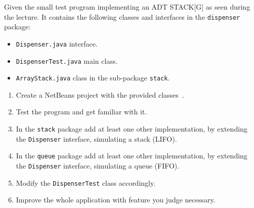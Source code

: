 
Given the small test program implementing an ADT STACK[G] as seen during the lecture. It contains the following classes and interfaces in the \texttt{dispenser} package:
\begin{itemize}
 \item \texttt{Dispenser.java} interface.
 \item \texttt{DispenserTest.java} main class.
 \item \texttt{ArrayStack.java} class in the sub-package \texttt{stack}.
\end{itemize}

\begin{enumerate}
 \item Create a NetBeans project with the provided classes~\cite{WEBGL}.
 \item Test the program and get familiar with it.
 \item In the \texttt{stack} package add at least one other implementation, by extending the \texttt{Dispenser} interface, simulating a stack (LIFO).
 \item In the \texttt{queue} package add at least one other implementation, by extending the \texttt{Dispenser} interface, simulating a queue (FIFO).
 \item Modify the \texttt{DispenserTest} class accordingly.
 \item Improve the whole application with feature you judge necessary.
\end{enumerate}


